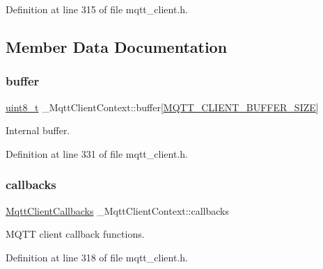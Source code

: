 Definition at line 315 of file mqtt\+\_\+client.\+h.



\subsection{Member Data Documentation}
\mbox{\label{struct__MqttClientContext_a36c316a35737e6160affa5c159cabf39}} 
\subsubsection{\texorpdfstring{buffer}{buffer}}
{\footnotesize\ttfamily \hyperlink{stdint_8h_aba7bc1797add20fe3efdf37ced1182c5}{uint8\+\_\+t} \+\_\+\+Mqtt\+Client\+Context\+::buffer\mbox{[}\hyperlink{mqtt__client_8h_a37c50db66771a2d524105033ca66ee7c}{M\+Q\+T\+T\+\_\+\+C\+L\+I\+E\+N\+T\+\_\+\+B\+U\+F\+F\+E\+R\+\_\+\+S\+I\+ZE}\mbox{]}}



Internal buffer. 



Definition at line 331 of file mqtt\+\_\+client.\+h.

\mbox{\label{struct__MqttClientContext_a568a820e1215398e4d12aa8311af8e9e}} 
\subsubsection{\texorpdfstring{callbacks}{callbacks}}
{\footnotesize\ttfamily \hyperlink{structMqttClientCallbacks}{Mqtt\+Client\+Callbacks} \+\_\+\+Mqtt\+Client\+Context\+::callbacks}



M\+Q\+TT client callback functions. 



Definition at line 318 of file mqtt\+\_\+client.\+h.

\mbox{\label{struct__MqttClientContext_a55be1361804af91b0d4572ce77d5d183}} 
